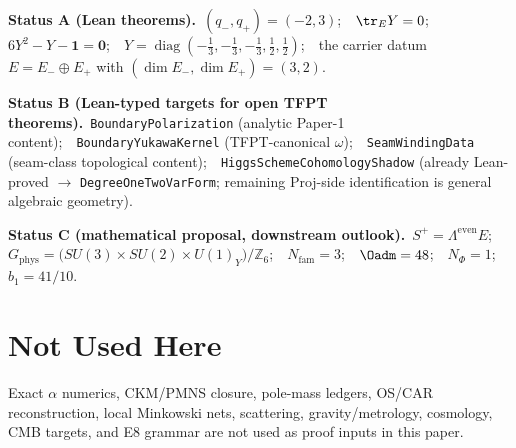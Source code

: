 \begin{tfptexports}
\textbf{Status A (Lean theorems).}\ $(q_-, q_+) = (-2, 3)$;\ \ $\tr_E Y = 0$;\ \
$6 Y^2 - Y - \mathbf 1 = \mathbf 0$;\ \
$Y = \operatorname{diag}(-\tfrac13,-\tfrac13,-\tfrac13,\tfrac12,\tfrac12)$;\ \ the carrier datum
$E = E_- \oplus E_+$ with $(\dim E_-, \dim E_+) = (3, 2)$.

\smallskip
\textbf{Status B (Lean-typed targets for open TFPT theorems).}\
\texttt{BoundaryPolarization} (analytic Paper-1 content);\ \
\texttt{BoundaryYukawaKernel} (TFPT-canonical $\omega$);\ \
\texttt{SeamWindingData} (seam-class topological content);\ \
\texttt{HiggsSchemeCohomologyShadow} (already Lean-proved $\to$ \texttt{DegreeOneTwoVarForm};
remaining Proj-side identification is general algebraic geometry).

\smallskip
\textbf{Status C (mathematical proposal, downstream outlook).}\
$S^+ = \Lambda^{\mathrm{even}} E$;\ \
$G_{\mathrm{phys}} = \big(SU(3)\times SU(2)\times U(1)_Y\big) / \mathbb Z_6$;\ \
$N_{\mathrm{fam}} = 3$;\ \ $\Oadm = 48$;\ \ $N_\Phi = 1$;\ \ $b_1 = 41/10$.
\end{tfptexports}

\section{Not Used Here}

Exact $\alpha$ numerics, CKM/PMNS closure, pole-mass ledgers, OS/CAR reconstruction, local
Minkowski nets, scattering, gravity/metrology, cosmology, CMB targets, and E8 grammar are not used
as proof inputs in this paper.


